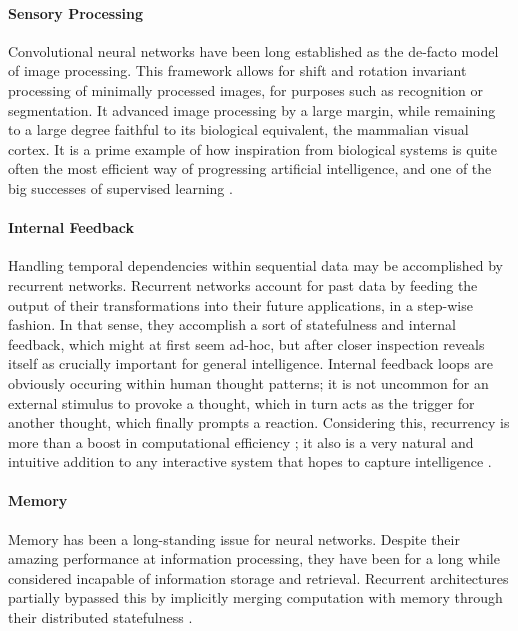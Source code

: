 \documentclass[]{article}
\begin{document}
\paragraph{Sensory Processing} Convolutional neural networks have been long established as the de-facto model of image processing. This framework allows for shift and rotation invariant processing of minimally processed images, for purposes such as recognition or segmentation. It advanced image processing by a large margin, while remaining to a large degree faithful to its biological equivalent, the mammalian visual cortex. It is a prime example of how inspiration from biological systems is quite often the most efficient way of progressing artificial intelligence, and one of the big successes of supervised learning \cite{Cichy2016}.

\paragraph{Internal Feedback}
Handling temporal dependencies within sequential data may be accomplished by recurrent networks. Recurrent networks account for past data by feeding the output of their transformations into their future applications, in a step-wise fashion. In that sense, they accomplish a sort of statefulness and internal feedback, which might at first seem ad-hoc, but after closer inspection reveals itself as crucially important for general intelligence. Internal feedback loops are obviously occuring within human thought patterns; it is not uncommon for an external stimulus to provoke a thought, which in turn acts as the trigger for another thought, which finally prompts a reaction. Considering this, recurrency is more than a boost in computational efficiency \cite{SIEGELMANN1995132}; it also is a very natural and intuitive addition to any interactive system that hopes to capture intelligence \cite{int}.

\paragraph{Memory}
Memory has been a long-standing issue for neural networks. Despite their amazing performance at information processing, they have been for a long while considered incapable of information storage and retrieval. Recurrent architectures partially bypassed this by implicitly merging computation with memory through their distributed statefulness \cite{Hinton13}. 
\end{document}
